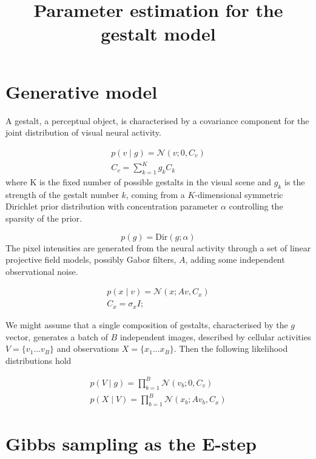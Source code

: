 \documentclass{paper}
\begin{document}
\title{Parameter estimation for the gestalt model}
\maketitle

\section{Generative model}

A gestalt, a perceptual object, is characterised by a covariance component for the joint distribution of visual neural activity. 

\begin{eqnarray}
p(v \mid g) = \mathcal{N}(v; 0,C_v) \\
C_v = \sum_{k=1}^K g_k C_k \label{eq:cv}
\end{eqnarray}
%
where K is the fixed number of possible gestalts in the visual scene and $g_k$ is the strength of the gestalt number $k$, coming from a $K$-dimensional symmetric Dirichlet prior distribution with concentration parameter $\alpha$ controlling the sparsity of the prior.

\begin{equation}
p(g) = \textrm{Dir}(g; \alpha)
\end{equation}
%
The pixel intensities are generated from the neural activity through a set of linear projective field models, possibly Gabor filters, $A$, adding some independent observational noise.

\begin{eqnarray}
p(x \mid v) = \mathcal{N}(x; Av,C_x) \\
C_x = \sigma_x I;
\end{eqnarray}

We might assume that a single composition of gestalts, characterised by the $g$ vector, generates a batch of $B$ independent images, described by cellular activities $V = \lbrace v_1 \dots v_B \rbrace$ and observations $X = \lbrace x_1 \dots x_B \rbrace$. Then the following likelihood distributions hold

\begin{eqnarray}
p(V \mid g) = \prod_{b=1}^B \mathcal{N}(v_b; 0,C_v) \\
p(X \mid V) = \prod_{b=1}^B \mathcal{N}(x_b; Av_b,C_x)
\end{eqnarray}

\section{Gibbs sampling as the E-step}
\end{document}
